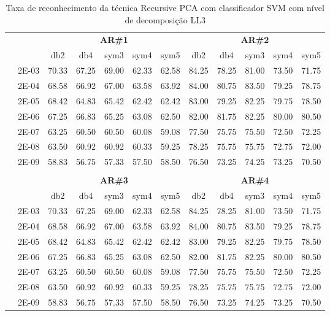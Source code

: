 \begin{table}[H]
	\centering
    \normalsize
	\caption{Taxa de reconhecimento da técnica Recursive PCA com classificador SVM com nível de decomposição LL3}
	\begin{tabular}{|c|c|c c c c c|c c c c c|}
\cline{3-12}
\multicolumn{2}{c|}{\multirow{2}{*}{}} & \multicolumn{5}{c|}{\textbf{AR\#1}}  & \multicolumn{5}{c|}{\textbf{AR\#2}} \\\cline{3-12}

\multicolumn{2}{c|}{}  & db2 & db4 & sym3 & sym4 & sym5 & db2 & db4& sym3 & sym4 & sym5 \\\hline
\multicolumn{1}{|c|}{ \multirow{6}{*}{\rotatebox[origin=c]{90}{\textbf{Gamma}}} }
&2E-03&	70.33&	67.25&	69.00&	62.33&	62.58&	84.25	&78.25&	81.00&	73.50&	71.75	\\\cline{2-12}
&2E-04&	68.58&	66.92&	67.00&	63.58&	63.92&	84.00	&80.75&	83.50&	79.25&	78.75	\\\cline{2-12}
&2E-05&	68.42&	64.83&	65.42&	62.42&	62.42&	83.00	&79.25&	82.25&	79.75&	78.50	\\\cline{2-12}
&2E-06&	67.25&	66.83&	65.25&	63.08&	62.50&	82.00	&81.75&	82.25&	80.00&	80.50	\\\cline{2-12}
&2E-07&	63.25&	60.50&	60.50&	60.08&	59.08&	77.50	&75.75&	75.50&	72.50&	72.25	\\\cline{2-12}
&2E-08&	63.50&	60.92&	60.92&	60.33&	59.25&	78.25	&75.75&	75.75&	72.75&	72.00	\\\cline{2-12}
&2E-09&	58.83&	56.75&	57.33&	57.50&	58.50&	76.50	&73.25&	74.25&	73.25&	70.50	


\\ \midrule
\multicolumn{12}{c}{}\\ 

\cline{3-12}
\multicolumn{2}{c}{} & \multicolumn{5}{|c|}{\textbf{AR\#3}}  & \multicolumn{5}{c|}{\textbf{AR\#4}} \\\cline{3-12}
\multicolumn{2}{c}{}  & \multicolumn{1}{|c}{db2} & db4 & sym3 & sym4 & sym5 & db2 & db4& sym3 & sym4 & sym5 \\\hline
\multicolumn{1}{|c|}{ \multirow{6}{*}{\rotatebox[origin=c]{90}{\textbf{Gamma}}} }
&2E-03&	70.33&	67.25&	69.00&	62.33&	62.58&	84.25	&78.25&	81.00&	73.50&	71.75\\\cline{2-12}
&2E-04&	68.58&	66.92&	67.00&	63.58&	63.92&	84.00	&80.75&	83.50&	79.25&	78.75\\\cline{2-12}
&2E-05&	68.42&	64.83&	65.42&	62.42&	62.42&	83.00	&79.25&	82.25&	79.75&	78.50\\\cline{2-12}
&2E-06&	67.25&	66.83&	65.25&	63.08&	62.50&	82.00	&81.75&	82.25&	80.00&	80.50\\\cline{2-12}
&2E-07&	63.25&	60.50&	60.50&	60.08&	59.08&	77.50	&75.75&	75.50&	72.50&	72.25\\\cline{2-12}
&2E-08&	63.50&	60.92&	60.92&	60.33&	59.25&	78.25	&75.75&	75.75&	72.75&	72.00\\\cline{2-12}
&2E-09&	58.83&	56.75&	57.33&	57.50&	58.50&	76.50	&73.25&	74.25&	73.25&	70.50
	
\\\midrule
\end{tabular}

\end{table}
